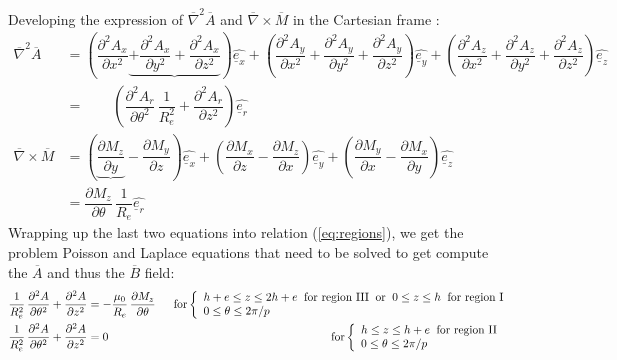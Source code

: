 Developing the expression of $\overline{\nabla}^2 \overline{A}$ and $\overline{\nabla} \times \overline{M}$ in the Cartesian frame :
\begin{align*}
\overline{\nabla}^2 \overline{A} &= \left( \dfrac{\partial ^2 A_x}{\partial x^2}\underbrace{ + \dfrac{\partial ^2 A_x}{\partial y^2} + \dfrac{\partial ^2A_x}{\partial z^2}}\right) \widehat{\underline{e}_x}+ \left( \dfrac{\partial ^2 A_y}{\partial x^2} + \dfrac{\partial ^2A_y}{\partial y^2} + \dfrac{\partial ^2 A_y}{\partial z^2}\right)\widehat{\underline{e}_y}+ \left( \dfrac{\partial ^2A_z}{\partial x^2} + \dfrac{\partial ^2 A_z}{\partial y^2} +\dfrac{\partial ^2 A_z}{\partial z^2}\right)\widehat{\underline{e}_z}\\
&= \qquad \left( \dfrac{\partial ^2 A_r}{\partial \theta^2}\,\dfrac{1}{R_e^2} + \dfrac{\partial ^2 A_r}{\partial z^2}\right)\widehat{\underline{e}_r} \\
\overline{\nabla} \times \overline{M} &= \left( \underbrace{ \dfrac{\partial M_z}{\partial y} }- \dfrac{\partial M_y}{\partial z} \right) \widehat{\underline{e}_x} + \left( \dfrac{\partial M_x}{\partial z} - \dfrac{\partial M_z}{\partial x} \right) \widehat{\underline{e}_y} +\left( \dfrac{\partial M_y}{\partial x} - \dfrac{\partial M_x}{\partial y} \right) \widehat{\underline{e}_z} \\
&= \dfrac{\partial M_z}{\partial \theta}\, \dfrac{1}{R_e} \widehat{\underline{e}_r}
\end{align*}
Wrapping up the last two equations into relation (\ref{eq:regions}), we get the problem Poisson and Laplace equations that need to be solved to get compute the $\overline{A}$ and thus the $\overline{B}$ field:
\begin{align}
\dfrac{1}{R_e^2}\, \dfrac{\partial^2 A}{\partial \theta ^2} +\dfrac{\partial^2 A}{\partial z^2} &= -\dfrac{\mu_0}{R_e}\, \dfrac{\partial M_z}{\partial \theta} \hspace{.2cm} &\text{for} \left\{ \begin{array}{l}  h+e \leq z \leq 2h+e \hspace{.2cm} \text{for region \rm III} \hspace{.2cm} \text{or}\hspace{.2cm} 0 \leq z \leq h \hspace{.2cm} \text{for region \rm I}\\ 
 0 \leq \theta \leq 2\pi/p 
\end{array}
\right. \\
\dfrac{1}{R_e^2}\, \dfrac{\partial^2 A}{\partial \theta ^2} +\dfrac{\partial^2 A}{\partial z^2} &= 0   &\text{for} \left\{ \begin{array}{l}  h \leq z \leq h+e \hspace{.2cm} \text{for region \rm II} \hspace{.2cm}\\  0 \leq \theta \leq 2\pi/p 
\end{array}
\right. 
\end{align}



